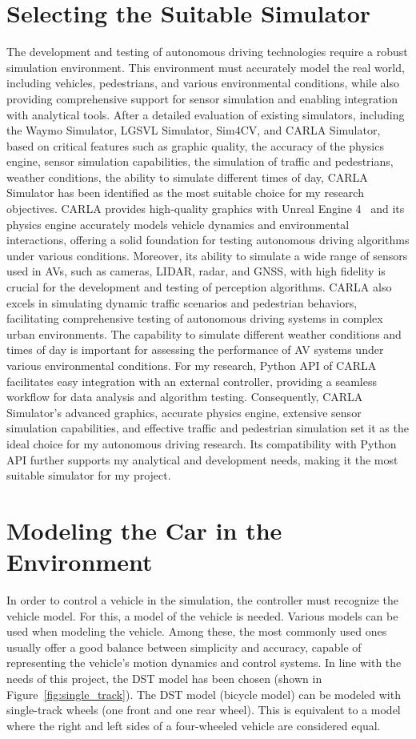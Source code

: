 \section{Selecting the Suitable Simulator}
The development and testing of autonomous driving technologies require a robust simulation environment. This environment must accurately model the real world, including vehicles, pedestrians, and various environmental conditions, while also providing comprehensive support for sensor simulation and enabling integration with analytical tools. After a detailed evaluation of existing simulators, including the Waymo Simulator, LGSVL Simulator, Sim4CV, and CARLA Simulator, based on critical features such as graphic quality, the accuracy of the physics engine, sensor simulation capabilities, the simulation of traffic and pedestrians, weather conditions, the ability to simulate different times of day, CARLA Simulator has been identified as the most suitable choice for my research objectives. CARLA provides high-quality graphics with Unreal Engine 4~\cite{unreal_engine_4} and its physics engine accurately models vehicle dynamics and environmental interactions, offering a solid foundation for testing autonomous driving algorithms under various conditions. Moreover, its ability to simulate a wide range of sensors used in \acsp{AV}, such as cameras, LIDAR, radar, and GNSS, with high fidelity is crucial for the development and testing of perception algorithms. CARLA also excels in simulating dynamic traffic scenarios and pedestrian behaviors, facilitating comprehensive testing of autonomous driving systems in complex urban environments. The capability to simulate different weather conditions and times of day is important for assessing the performance of \ac{AV} systems under various environmental conditions. For my research, Python API of CARLA facilitates easy integration with an external controller, providing a seamless workflow for data analysis and algorithm testing. Consequently, CARLA Simulator's advanced graphics, accurate physics engine, extensive sensor simulation capabilities, and effective traffic and pedestrian simulation set it as the ideal choice for my autonomous driving research. Its compatibility with Python API further supports my analytical and development needs, making it the most suitable simulator for my project.

\section{Modeling the Car in the Environment}
In order to control a vehicle in the simulation, the controller must recognize the vehicle model. For this, a model of the vehicle is needed. Various models can be used when modeling the vehicle. Among these, the most commonly used ones usually offer a good balance between simplicity and accuracy, capable of representing the vehicle's motion dynamics and control systems. In line with the needs of this project, the \ac{DST} model has been chosen (shown in Figure~\ref{fig:single_track}). The \acs{DST} model (bicycle model) can be modeled with single-track wheels (one front and one rear wheel). This is equivalent to a model where the right and left sides of a four-wheeled vehicle are considered equal.

